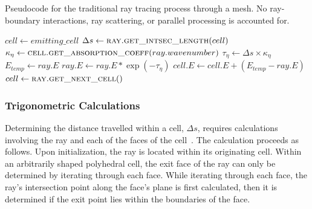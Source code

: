 \begin{algorithm}
    \caption{Pseudocode for the traditional ray tracing process through a mesh. No ray-boundary interactions, ray scattering, or parallel processing is accounted for.}
    \label{alg:traditional_raytracing}
    \begin{algorithmic}[1] %

                    \State {} 
                    \State $cell\gets emitting\_cell$
                    \label{lst:line:energymin}
                        \State $\Delta{s} \gets \Call{ray.get\_intsec\_length}{cell}$
                        \State $\kappa{}_\eta{} \gets \Call{cell.get\_absorption\_coeff}{ray.wavenumber}$
                        \State $\tau_\eta{} \gets \Delta{s}\times{\kappa{}_\eta{}}$ 
                        \State $E_{temp} \gets ray.E$ 
                        \State $ray.E \gets ray.E * \exp{(-\tau_\eta)}$ \label{lst:line:beerslaw}
                        \State $cell.E \gets cell.E + (E_{temp} - ray.E)$
                        \State $cell \gets \Call{ray.get\_next\_cell}{ }$
                    \EndWhile
                \EndFor
            \EndFor
        \EndProcedure
        
    \end{algorithmic}
\end{algorithm}



\subsubsection{Trigonometric Calculations}
Determining the distance travelled within a cell, $\Delta{s}$, requires calculations involving the ray and each of the faces of the cell~\cite{Zeeb2001AnGeometries}.
The calculation proceeds as follows. Upon initialization, the ray is located within its originating cell. Within an arbitrarily shaped polyhedral cell, the exit face of the ray can only be determined by iterating through each face.
While iterating through each face, the ray's intersection point along the face's plane is first calculated, then it is determined if the exit point lies within the boundaries of the face.

